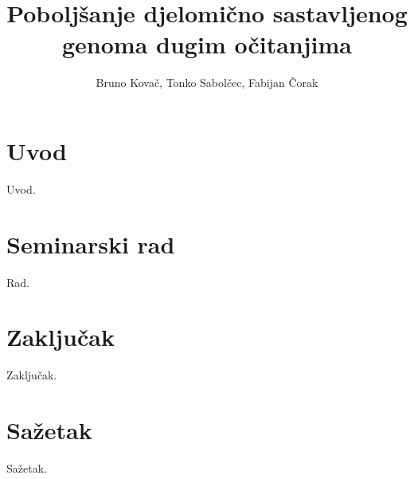 \documentclass[times, utf8, seminar, numeric]{fer}
\begin{document}
\nocite{*}

\title{Poboljšanje djelomično sastavljenog genoma dugim očitanjima}

\author{Bruno Kovač, Tonko Sabolčec, Fabijan Čorak}


\maketitle

\tableofcontents

\chapter{Uvod}
Uvod.

\chapter{Seminarski rad}
Rad.

\chapter{Zaključak}
Zaključak.




\chapter{Sažetak}
Sažetak.
\end{document}
